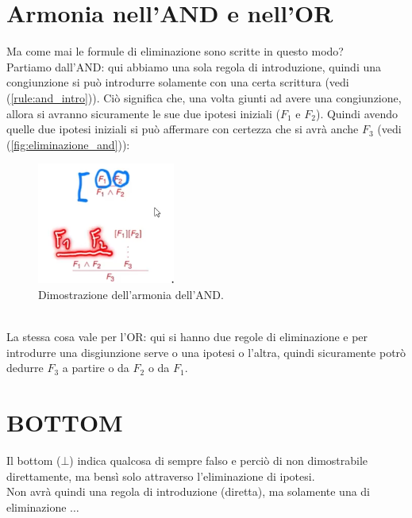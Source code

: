 \documentclass[12pt]{article}
\begin{document}
\section{Armonia nell'AND e nell'OR}
Ma come mai le formule di eliminazione sono scritte in questo modo?\\
Partiamo dall'AND: qui abbiamo una sola regola di introduzione, quindi una congiunzione si può introdurre solamente con una certa scrittura (vedi (\ref{rule:and_intro})). Ciò significa che, una volta giunti ad avere una congiunzione, allora si avranno sicuramente le sue due ipotesi iniziali ($F_1$ e $F_2$). Quindi avendo quelle due ipotesi iniziali si può affermare con certezza che si avrà anche $F_3$ (vedi (\ref{fig:eliminazione_and})):
\begin{figure}[!htb]
    \centering
    \includegraphics[width=.9\linewidth,height=.40\textheight,keepaspectratio]{logica_proposizionale/introduzione/armonia_and.PNG} %
    \begin{center}
        \caption{\label{fig:armonia_and}Dimostrazione dell'armonia dell'AND.} %
    \end{center}
\end{figure}\\
La stessa cosa vale per l'OR: qui si hanno due regole di eliminazione e per introdurre una disgiunzione serve o una ipotesi o l'altra, quindi sicuramente potrò dedurre $F_3$ a partire o da $F_2$ o da $F_1$.
\pagebreak
\section{BOTTOM}
Il bottom ($\bot$) indica qualcosa di sempre falso e perciò di non dimostrabile direttamente, ma bensì solo attraverso l'eliminazione di ipotesi.\\
Non avrà quindi una regola di introduzione (diretta), ma solamente una di eliminazione $\dots$
\end{document}
